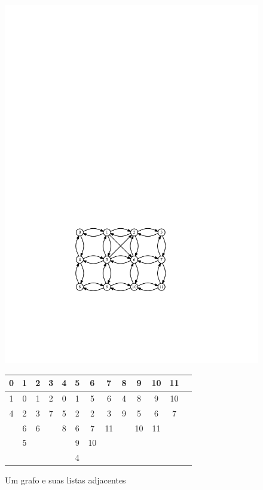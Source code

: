 \begin{figure}
	\begin{center}
		\includegraphics[scale=0.90909]{figs/graph} \\[3ex]
		\begin{tabular}{|c|c|c|c|c|c|c|c|c|c|c|c|c|}\hline
			0&1&2&3&4&5&6 &7 &8&9 &10&11 \\\hline
			1&0&1&2&0&1&5 &6 &4&8 &9 &10 \\
			4&2&3&7&5&2&2 &3 &9&5 &6 &7 \\
			&6&6& &8&6&7 &11& &10&11& \\
			&5& & & &9&10&  & &  &  & \\
			& & & & &4&  &  & &  &  & \\
		\end{tabular} 
	\end{center}
	\caption{Um grafo e suas listas adjacentes}
\end{figure}


